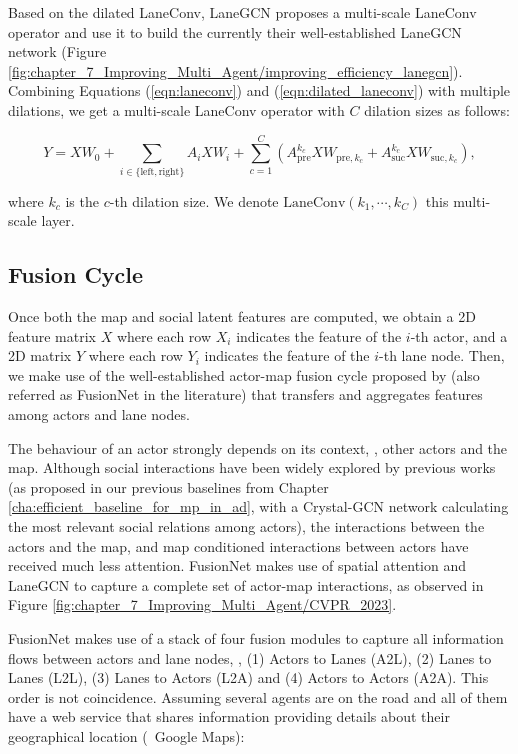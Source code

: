 Based on the dilated LaneConv, LaneGCN \cite{liang2020learning} proposes a multi-scale LaneConv operator and use it to build the currently their well-established LaneGCN network (Figure \ref{fig:chapter_7_Improving_Multi_Agent/improving_efficiency_lanegcn}). Combining Equations (\ref{eqn:laneconv}) and (\ref{eqn:dilated_laneconv}) with multiple dilations, we get a multi-scale LaneConv operator with $C$ dilation sizes as follows:

\begin{equation}\label{eqn:dilated_laneconv_final}
	Y = XW_0 + \sum_{i \in \{ \text{left}, \text{right} \}} {A_{i} X W_{i}}
	+ \sum_{c=1}^{C} {\left( A_{\text{pre}}^{k_{c}} X W_{\text{pre},k_{c}} + A_{\text{suc}}^{k_{c}} X W_{\text{suc},k_{c}} \right)},
\end{equation}

where $k_c$ is the $c$-th dilation size. We denote  $\text{LaneConv}(k_1, \cdots, k_C)$ this multi-scale layer. 

\subsection{Fusion Cycle}
\label{subsubsec:4_improving_efficiency_fusion_cycle}

Once both the map and social latent features are computed, we obtain a 2D feature matrix $X$ where each row $X_i$ indicates the feature of the $i$-th actor, and a 2D matrix $Y$ where each row $Y_i$ indicates the feature of the $i$-th lane node. Then, we make use of the well-established actor-map fusion cycle proposed by \cite{liang2020learning} (also referred as FusionNet in the literature) that transfers and aggregates features among actors and lane nodes. 

The behaviour of an actor strongly depends on its context, \ie, other actors and the map. Although social interactions have been widely explored by previous works (as proposed in our previous baselines from Chapter \ref{cha:efficient_baseline_for_mp_in_ad}, with a Crystal-\ac{GCN} network calculating the most relevant social relations among actors), the interactions between the actors and the map, and map conditioned interactions between actors have received much less attention. FusionNet makes use of spatial attention and LaneGCN to capture a complete set of actor-map interactions, as observed in Figure \ref{fig:chapter_7_Improving_Multi_Agent/CVPR_2023}.

FusionNet makes use of a stack of four fusion modules to capture all information flows between actors and lane nodes, \ie, (1) Actors to Lanes (A2L), (2) Lanes to Lanes (L2L), (3) Lanes to Actors (L2A) and (4) Actors to Actors (A2A). This order is not coincidence. Assuming several agents are on the road and all of them have a web service that shares information providing details about their geographical location (\eg \ Google Maps):

